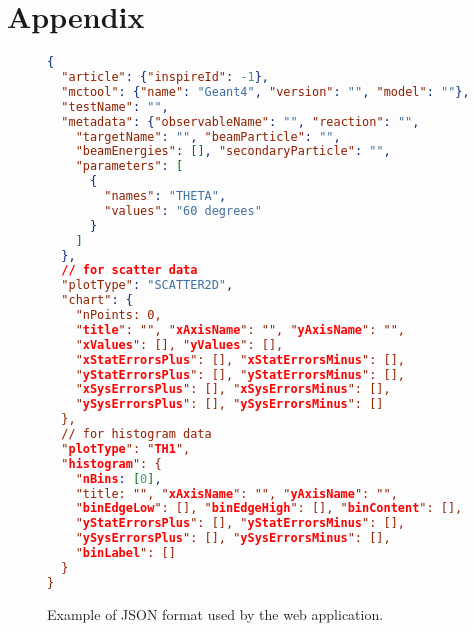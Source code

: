\setcounter{figure}{0}
\renewcommand{\figurename}{Appendix}

\newpage
\section{Appendix}

\begin{figure}[h]

\begin{lstlisting}[language=json,firstnumber=1]
{
  "article": {"inspireId": -1},
  "mctool": {"name": "Geant4", "version": "", "model": ""},
  "testName": "",
  "metadata": {"observableName": "", "reaction": "",
    "targetName": "", "beamParticle": "",
    "beamEnergies": [], "secondaryParticle": "",
    "parameters": [
      {
        "names": "THETA",
        "values": "60 degrees"
      }
    ]
  },
  // for scatter data
  "plotType": "SCATTER2D",
  "chart": {
    "nPoints: 0,
    "title": "", "xAxisName": "", "yAxisName": "",
    "xValues": [], "yValues": [],
    "xStatErrorsPlus": [], "xStatErrorsMinus": [],
    "yStatErrorsPlus": [], "yStatErrorsMinus": [],
    "xSysErrorsPlus": [], "xSysErrorsMinus": [],
    "ySysErrorsPlus": [], "ySysErrorsMinus": []
  },
  // for histogram data
  "plotType": "TH1",
  "histogram": {
    "nBins: [0],
    "title: "", "xAxisName": "", "yAxisName": "",
    "binEdgeLow": [], "binEdgeHigh": [], "binContent": [],
    "yStatErrorsPlus": [], "yStatErrorsMinus": [],
    "ySysErrorsPlus": [], "ySysErrorsMinus": [],
    "binLabel": []
  }
}
\end{lstlisting}

\caption{Example of JSON format used by the web application.}
\label{adx:JSON-format}
\end{figure}

